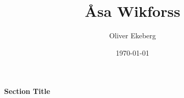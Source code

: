 \documentclass[11pt, a4paper]{article}
\title{Åsa Wikforss}
\author{Oliver Ekeberg}
\date{\today}
\newenvironment{sectionbox}[1][]{%
    \begin{sectionboxinner}
    \textbf{\large #1}
    \vspace{1pt}
    \newline
}{%
    \end{sectionboxinner}
}
\begin{document}
\maketitle

\tableofcontents

\begin{sectionbox}[Section Title]

\end{sectionbox}
\end{document}
